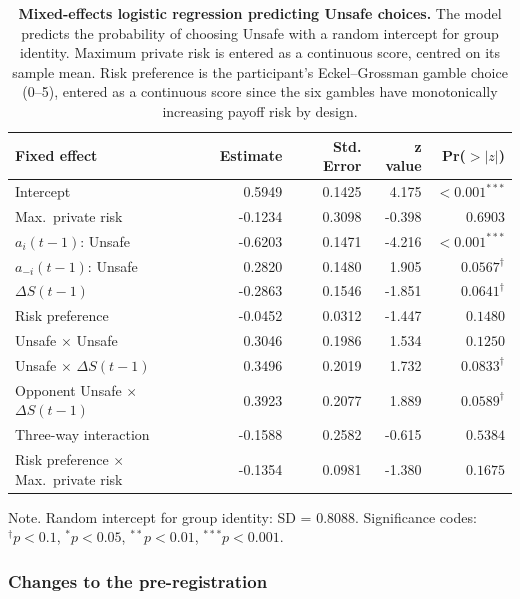 \documentclass[pdflatex,sn-mathphys-ay]{sn-jnl}
\theoremstyle{thmstyleone}
\theoremstyle{thmstyletwo}
\theoremstyle{thmstylethree}
\begin{document}
\begin{table}[h]
\centering
\caption{\textbf{Mixed-effects logistic regression predicting Unsafe choices.} The model predicts the probability of choosing Unsafe with a random intercept for group identity. Maximum private risk is entered as a continuous score, centred on its sample mean. Risk preference is the participant's Eckel--Grossman gamble choice (0--5), entered as a continuous score since the six gambles have monotonically increasing payoff risk by design.}
\label{tab:si:prereg-mixed-model}
\begin{tabular}{lrrrr}
\toprule
\textbf{Fixed effect} & \textbf{Estimate} & \textbf{Std. Error} & \textbf{z value} & \textbf{Pr(\(>|z|\))} \\
\midrule
Intercept & 0.5949 & 0.1425 & 4.175 & \(<0.001^{***}\) \\
Max.\ private risk & -0.1234 & 0.3098 & -0.398 & \(0.6903\) \\
\(a_i(t-1)\): Unsafe & -0.6203 & 0.1471 & -4.216 & \(<0.001^{***}\) \\
\(a_{-i}(t-1)\): Unsafe & 0.2820 & 0.1480 & 1.905 & \(0.0567^{\dagger}\) \\
\(\Delta S(t-1)\) & -0.2863 & 0.1546 & -1.851 & \(0.0641^{\dagger}\) \\
Risk preference & -0.0452 & 0.0312 & -1.447 & \(0.1480\) \\
Unsafe \(\times\) Unsafe & 0.3046 & 0.1986 & 1.534 & \(0.1250\) \\
Unsafe \(\times\) \(\Delta S(t-1)\) & 0.3496 & 0.2019 & 1.732 & \(0.0833^{\dagger}\) \\
Opponent Unsafe \(\times\) \(\Delta S(t-1)\) & 0.3923 & 0.2077 & 1.889 & \(0.0589^{\dagger}\) \\
Three-way interaction & -0.1588 & 0.2582 & -0.615 & \(0.5384\) \\
Risk preference \(\times\) Max.\ private risk & -0.1354 & 0.0981 & -1.380 & \(0.1675\) \\
\bottomrule
\end{tabular}

\vspace{0.5em}
\raggedright
\footnotesize Note. Random intercept for group identity: SD = 0.8088. Significance codes: \(^{\dagger}p<0.1\), \(^{*}p<0.05\), \(^{**}p<0.01\), \(^{***}p<0.001\).
\end{table}

\subsubsection{Changes to the pre-registration}
\label{si:sec:prereg-changes}
\end{document}
